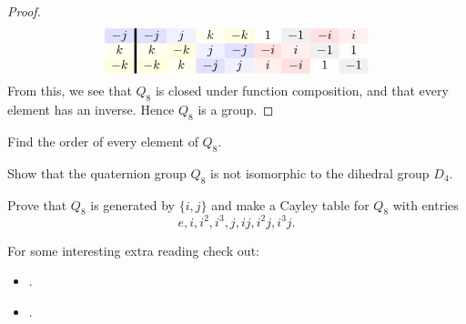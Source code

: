 \documentclass{ximera}
\begin{document}
\begin{example}
\begin{proof}
\begin{gather*}
\begin{array}{c!{\vline width 2pt}cccccccc}
      -j \cellcolor{blue!12!white}& -j \cellcolor{blue!12!white} & j \cellcolor{blue!6!white} & k \cellcolor{yellow!6!white}  & -k\cellcolor{yellow!12!white} & 1  & -1 \cellcolor{black!6!white} & -i \cellcolor{red!12!white} & i \cellcolor{red!6!white} \\
      k \cellcolor{yellow!6!white}& k \cellcolor{yellow!6!white} & -k \cellcolor{yellow!12!white} & j \cellcolor{blue!6!white}  & -j\cellcolor{blue!12!white} & -i \cellcolor{red!12!white} & i\cellcolor{red!6!white}  & -1 \cellcolor{black!6!white} & 1  \\
      -k \cellcolor{yellow!12!white}& -k \cellcolor{yellow!12!white} & k \cellcolor{yellow!6!white} & -j \cellcolor{blue!12!white}  & j\cellcolor{blue!6!white} & i \cellcolor{red!6!white} & -i\cellcolor{red!12!white}  & 1 & -1 \cellcolor{black!6!white}
    \end{array}
    \end{gather*}
    From this, we see that $Q_8$ is closed under function composition,
    and that every element has an inverse. Hence $Q_8$ is a group.
  \end{proof}
\end{example}

\begin{exercise}
  Find the order of every element of $Q_8$.
\end{exercise}


\begin{exercise}
   Show that the quaternion group $Q_8$ is not isomorphic to the
   dihedral group $D_4$.
\end{exercise}

\begin{exercise}
  Prove that $Q_8$ is generated by $\{i, j\}$ and make a Cayley table
  for $Q_8$ with entries
  \[
  e, i, i^2, i^3, j, ij, i^2j, i^3j.
  \]
\end{exercise}


For some interesting extra reading check out:
\begin{itemize}
\item {}.
\item {}.
\end{itemize}
\end{document}
